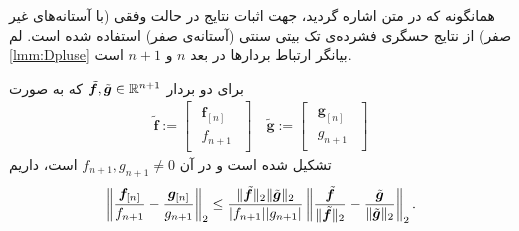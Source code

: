 همانگونه که در متن اشاره گردید، جهت اثبات نتایج در حالت وفقی (با آستانه‌های غیر صفر) از نتایج حسگری فشرده‌ی تک بیتی سنتی (آستانه‌ی صفر) استفاده شده است. لم 
\ref{lmm:Dpluse}
بیانگر ارتباط بردار‌ها در بعد
$n$
و
$n+1$
است.
\begin{lemma}
\label{lmm:Dpluse}
برای دو بردار
$\tilde{\bm{f}},\tilde{\bm{g}}\in \mathbb{R}^{n+1}$
که به صورت 
\begin{align}
\label{eq:Dpluse1}
	\tilde{\bm{f}} :=
	\begin{bmatrix}
	\begin{array}{c}
	\bm{f}_{[n]} \\
	\hline
	f_{n+1}
	\end{array}
	\end{bmatrix}
	\quad
	\tilde{\bm{g}} :=
	\begin{bmatrix}
	\begin{array}{c}
	\bm{g}_{[n]} \\
	\hline
	g_{n+1}
	\end{array}
	\end{bmatrix}	
\end{align}
تشکیل شده است و در آن
$f_{n+1},g_{n+1}\neq 0$
است، داریم	
\begin{align}
\label{eq:Dpluse2}
\left\lVert\dfrac{\bm{f}_{[n]}}{f_{n+1}}-\dfrac{\bm{g}_{[n]}}{g_{n+1}}\right\rVert_{2} \leq 	\dfrac{\|\tilde{\bm{f}}\|_{2}\|\tilde{\bm{g}}\|_{2}}{\vert f_{n+1}\vert \vert g_{n+1}\vert} \left\lVert\dfrac{\tilde{\bm{f}}}{\|\tilde{\bm{f}}\|_{2}}-\dfrac{\tilde{\bm{g}}}{\|\tilde{\bm{g}}\|_{2}}\right\rVert_{2}.
\end{align}
\end{lemma}
